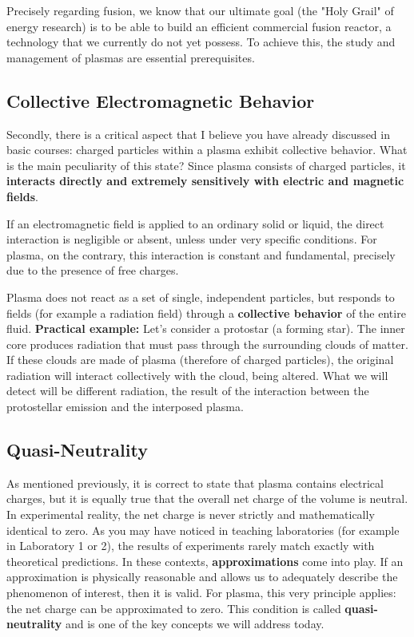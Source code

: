 Precisely regarding fusion, we know that our ultimate goal (the "Holy Grail" of energy research) is to be able to build an efficient commercial fusion reactor, a technology that we currently do not yet possess. To achieve this, the study and management of plasmas are essential prerequisites.

    \subsection{Collective Electromagnetic Behavior}
    
    Secondly, there is a critical aspect that I believe you have already discussed in basic courses: charged particles within a plasma exhibit collective behavior.
    What is the main peculiarity of this state? Since plasma consists of charged particles, it \textbf{interacts directly and extremely sensitively with electric and magnetic fields}.
    
    If an electromagnetic field is applied to an ordinary solid or liquid, the direct interaction is negligible or absent, unless under very specific conditions. For plasma, on the contrary, this interaction is constant and fundamental, precisely due to the presence of free charges.
    
    Plasma does not react as a set of single, independent particles, but responds to fields (for example a radiation field) through a \textbf{collective behavior} of the entire fluid.
    \textbf{Practical example:} Let's consider a protostar (a forming star). The inner core produces radiation that must pass through the surrounding clouds of matter. If these clouds are made of plasma (therefore of charged particles), the original radiation will interact collectively with the cloud, being altered. What we will detect will be different radiation, the result of the interaction between the protostellar emission and the interposed plasma.
    
    \subsection{Quasi-Neutrality}
    
    As mentioned previously, it is correct to state that plasma contains electrical charges, but it is equally true that the overall net charge of the volume is neutral.
    In experimental reality, the net charge is never strictly and mathematically identical to zero. As you may have noticed in teaching laboratories (for example in Laboratory 1 or 2), the results of experiments rarely match exactly with theoretical predictions. In these contexts, \textbf{approximations} come into play. If an approximation is physically reasonable and allows us to adequately describe the phenomenon of interest, then it is valid.
    For plasma, this very principle applies: the net charge can be approximated to zero. This condition is called \textbf{quasi-neutrality} and is one of the key concepts we will address today.
    
